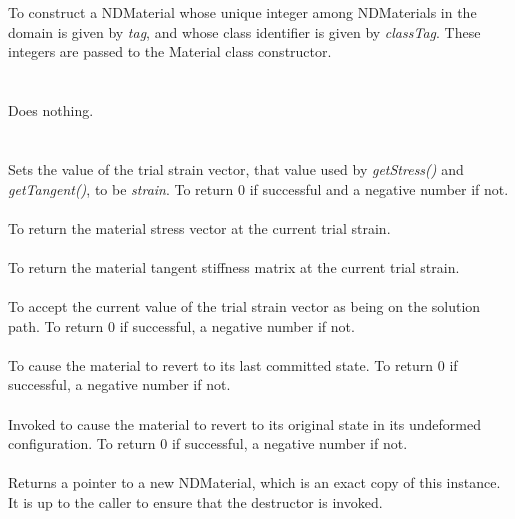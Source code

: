   \\
  \\
To construct a NDMaterial whose unique integer among
NDMaterials in the domain is given by {\em tag}, and whose class
identifier is given by {\em classTag}. These integers are passed to
the Material class constructor. \\

 \\
 \\
Does nothing. \\ 

 \\
  \\
Sets the value of the trial strain vector, that value used by {\em
getStress()} and {\em getTangent()}, to be {\em strain}. To return $0$
if successful and a negative number if not. \\

 \\
To return the material stress vector at the current trial strain. \\

 \\
To return the material tangent stiffness matrix at the current trial
strain. \\

 \\
To accept the current value of the trial strain vector as being on the
solution path. To return $0$ if successful, a negative number if not. \\

 \\
To cause the material to revert to its last committed state. To
return $0$ if successful, a negative number if not. \\

 \\
Invoked to cause the material to revert to its original state in its
undeformed configuration. To return $0$ if successful, a negative
number if not. \\

 \\
Returns a pointer to a new NDMaterial,
which is an exact copy of this instance. It is up to the caller to
ensure that the destructor is invoked. \\